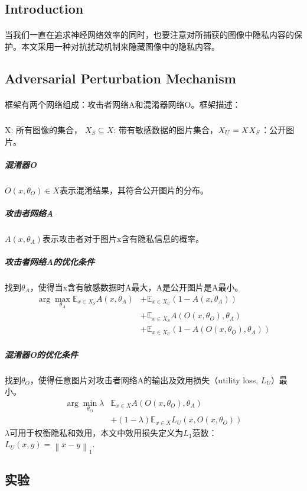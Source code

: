 \documentclass[12pt,a4paper]{article}
\begin{document}
\subsection{Introduction}
\paragraph{} 当我们一直在追求神经网络效率的同时，也要注意对所捕获的图像中隐私内容的保护。本文采用一种对抗扰动机制来隐藏图像中的隐私内容。

\subsection{Adversarial Perturbation Mechanism}
\paragraph{} 框架有两个网络组成：攻击者网络A和混淆器网络O。框架描述：
	\subparagraph{} X: 所有图像的集合， $X_S \subseteq X$: 带有敏感数据的图片集合，$X_U = X \\ X_S$：公开图片。
	\subparagraph{混淆器O} $O(x, \theta_O) \in X$表示混淆结果，其符合公开图片的分布。
	\subparagraph{攻击者网络A} $A(x, \theta_A)$表示攻击者对于图片x含有隐私信息的概率。
	\subparagraph{攻击者网络A的优化条件} 找到$\theta_A$，使得当x含有敏感数据时A最大，A是公开图片是A最小。
		\begin{equation}
			\begin{split}
				\arg\max_{\theta_A}\mathbb{E}_{x\in X_S}A(x,\theta_A) &+ \mathbb{E}_{x\in X_U}(1-A(x,\theta_A)) \\
					& +\mathbb{E}_{x\in X_S}A(O(x, \theta_O),\theta_A) \\
					& +\mathbb{E}_{x\in X_U}(1-A(O(x, \theta_O),\theta_A))
			\end{split}
		\end{equation}
	\subparagraph{混淆器O的优化条件} 找到$\theta_O$，使得任意图片对攻击者网络A的输出及效用损失（utility loss, $L_U$）最小。
		\begin{equation}
			\begin{split}
				\arg\min_{\theta_O}\lambda & \mathbb{E}_{x \in X} A(O(x, \theta_O),\theta_A) \\
					& +(1-\lambda)\mathbb{E}_{x\in X}L_U(x, O(x,\theta_O))
			\end{split}
		\end{equation}
	$\lambda$可用于权衡隐私和效用，本文中效用损失定义为$L_1$范数：$L_U(x,y)=\left \| x -y \right \|_1$.

\subsection{实验}
\end{document}
